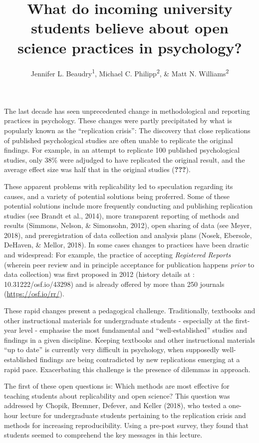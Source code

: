\documentclass[
  english,
  man,mask,floatsintext]{apa6}
\title{What do incoming university students believe about open science practices in psychology?}
\author{Jennifer L. Beaudry\textsuperscript{1}, Michael C. Philipp\textsuperscript{2}, \& Matt N. Williams\textsuperscript{2}}
\date{}
\affiliation{\vspace{0.5cm}\textsuperscript{1} Swinburne University of Technology\\\textsuperscript{2} Massey University}
\begin{document}
\maketitle

The last decade has seen unprecedented change in methodological and reporting practices in psychology. These changes were partly precipitated by what is popularly known as the \enquote{replication crisis}: The discovery that close replications of published psychological studies are often unable to replicate the original findings. For example, in an attempt to replicate 100 published psychological studies, only 38\% were adjudged to have replicated the original result, and the average effect size was half that in the original studies ({\textbf{???}}).

These apparent problems with replicability led to speculation regarding its causes, and a variety of potential solutions being proferred. Some of these potential solutions include more frequently conducting and publishing replication studies (see Brandt et al., 2014), more transparent reporting of methods and results (Simmons, Nelson, \& Simonsohn, 2012), open sharing of data (see Meyer, 2018), and preregistration of data collection and analysis plans (Nosek, Ebersole, DeHaven, \& Mellor, 2018). In some cases changes to practices have been drastic and widespread: For example, the practice of accepting \emph{Registered Reports} (wherein peer review and in principle acceptance for publication happens \emph{prior} to data collection) was first proposed in 2012 (history details at : 10.31222/osf.io/43298) and is already offered by more than 250 journals (\url{https://osf.io/rr/}).

These rapid changes present a pedagogical challenge. Traditionally, textbooks and other instructional materials for undergraduate students - especially at the first-year level - emphasise the most fundamental and \enquote{well-established} studies and findings in a given discipline.
Keeping textbooks and other instructional materials \enquote{up to date} is currently very difficult in psychology, when supposedly well-established findings are being contradicted by new replications emerging at a rapid pace. Exacerbating this challenge is the presence of dilemmas in approach.

The first of these open questions is: Which methods are most effective for teaching students about replicability and open science? This question was addressed by Chopik, Bremner, Defever, and Keller (2018), who tested a one-hour lecture for undergraduate students pertaining to the replication crisis and methods for increasing reproducibility. Using a pre-post survey, they found that students seemed to comprehend the key messages in this lecture.
\end{document}
